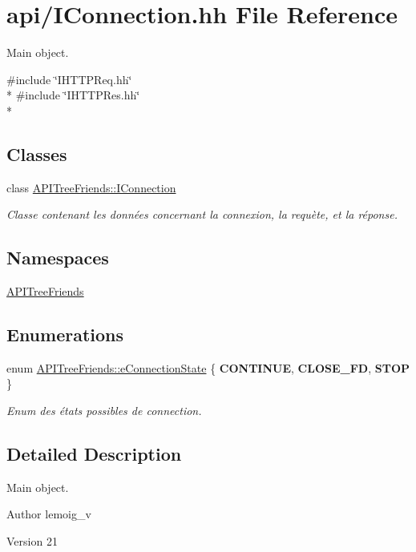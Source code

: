 \hypertarget{_i_connection_8hh}{}\section{api/\+I\+Connection.hh File Reference}
\label{_i_connection_8hh}


Main object.  


{\ttfamily \#include \char`\"{}I\+H\+T\+T\+P\+Req.\+hh\char`\"{}}\\*
{\ttfamily \#include \char`\"{}I\+H\+T\+T\+P\+Res.\+hh\char`\"{}}\\*
\subsection*{Classes}
\begin{DoxyCompactItemize}
\item 
class \hyperlink{class_a_p_i_tree_friends_1_1_i_connection}{A\+P\+I\+Tree\+Friends\+::\+I\+Connection}
\begin{DoxyCompactList}\small\item\em Classe contenant les données concernant la connexion, la requète, et la réponse. \end{DoxyCompactList}\end{DoxyCompactItemize}
\subsection*{Namespaces}
\begin{DoxyCompactItemize}
\item 
 \hyperlink{namespace_a_p_i_tree_friends}{A\+P\+I\+Tree\+Friends}
\end{DoxyCompactItemize}
\subsection*{Enumerations}
\begin{DoxyCompactItemize}
\item 
\hypertarget{namespace_a_p_i_tree_friends_a746fed077303e8587bfa0e8f2dbf4997}{}enum \hyperlink{namespace_a_p_i_tree_friends_a746fed077303e8587bfa0e8f2dbf4997}{A\+P\+I\+Tree\+Friends\+::e\+Connection\+State} \{ {\bfseries C\+O\+N\+T\+I\+N\+U\+E}, 
{\bfseries C\+L\+O\+S\+E\+\_\+\+F\+D}, 
{\bfseries S\+T\+O\+P}
 \}\label{namespace_a_p_i_tree_friends_a746fed077303e8587bfa0e8f2dbf4997}

\begin{DoxyCompactList}\small\item\em Enum des états possibles de connection. \end{DoxyCompactList}\end{DoxyCompactItemize}


\subsection{Detailed Description}
Main object. 

\begin{DoxyAuthor}{Author}
lemoig\+\_\+v 
\end{DoxyAuthor}
\begin{DoxyVersion}{Version}
21 
\end{DoxyVersion}
